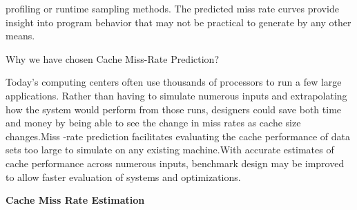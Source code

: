 \documentclass[12pt]{article}
\begin{document}
\vspace{\baselineskip}
\begin{adjustwidth}{0.0in}{0.12in}
{\fontsize{11pt}{13.2pt}\selectfont \textcolor[HTML]{333333}{profiling or runtime sampling methods. The predicted miss rate curves provide insight into program behavior that may not be practical to generate by any other means.}\par}\par

\end{adjustwidth}


\vspace{\baselineskip}
{\fontsize{20pt}{24.0pt}\selectfont Why we have chosen Cache Miss-Rate Prediction?\par}\par


\vspace{\baselineskip}

\vspace{\baselineskip}
\begin{adjustwidth}{0.0in}{0.11in}
{\fontsize{11pt}{13.2pt}\selectfont Today’s computing centers often use thousands of processors to run a few large applications. Rather than having to simulate numerous inputs and extrapolating how the system would perform from those runs, designers could save both time and money by being able to see the change in miss rates as cache size changes.Miss -rate prediction facilitates evaluating the cache performance of data sets too large to simulate on any existing machine.With accurate estimates of cache performance across numerous inputs, benchmark design may be improved to allow faster evaluation of systems and optimizations.\par}\par

\end{adjustwidth}


\vspace{\baselineskip}

\vspace{\baselineskip}

\vspace{\baselineskip}

\vspace{\baselineskip}
{\fontsize{18pt}{21.6pt}\selectfont \textbf{\textcolor[HTML]{333333}{Cache Miss Rate Estimation}}\par}\par


\vspace{\baselineskip}
\end{document}
